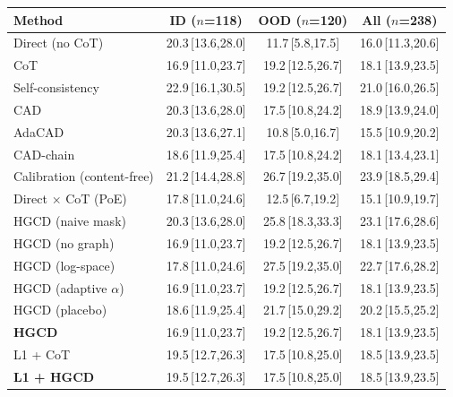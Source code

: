 \begin{tabular}{lccc}
\toprule
Method & ID ($n$=118) & OOD ($n$=120) & All ($n$=238) \\
\midrule
Direct (no CoT) & 20.3\,{\scriptsize[13.6,28.0]} & 11.7\,{\scriptsize[5.8,17.5]} & 16.0\,{\scriptsize[11.3,20.6]} \\
CoT & 16.9\,{\scriptsize[11.0,23.7]} & 19.2\,{\scriptsize[12.5,26.7]} & 18.1\,{\scriptsize[13.9,23.5]} \\
Self-consistency & 22.9\,{\scriptsize[16.1,30.5]} & 19.2\,{\scriptsize[12.5,26.7]} & 21.0\,{\scriptsize[16.0,26.5]} \\
CAD & 20.3\,{\scriptsize[13.6,28.0]} & 17.5\,{\scriptsize[10.8,24.2]} & 18.9\,{\scriptsize[13.9,24.0]} \\
AdaCAD & 20.3\,{\scriptsize[13.6,27.1]} & 10.8\,{\scriptsize[5.0,16.7]} & 15.5\,{\scriptsize[10.9,20.2]} \\
CAD-chain & 18.6\,{\scriptsize[11.9,25.4]} & 17.5\,{\scriptsize[10.8,24.2]} & 18.1\,{\scriptsize[13.4,23.1]} \\
Calibration (content-free) & 21.2\,{\scriptsize[14.4,28.8]} & 26.7\,{\scriptsize[19.2,35.0]} & 23.9\,{\scriptsize[18.5,29.4]} \\
Direct $\times$ CoT (PoE) & 17.8\,{\scriptsize[11.0,24.6]} & 12.5\,{\scriptsize[6.7,19.2]} & 15.1\,{\scriptsize[10.9,19.7]} \\
HGCD (naive mask) & 20.3\,{\scriptsize[13.6,28.0]} & 25.8\,{\scriptsize[18.3,33.3]} & 23.1\,{\scriptsize[17.6,28.6]} \\
HGCD (no graph) & 16.9\,{\scriptsize[11.0,23.7]} & 19.2\,{\scriptsize[12.5,26.7]} & 18.1\,{\scriptsize[13.9,23.5]} \\
HGCD (log-space) & 17.8\,{\scriptsize[11.0,24.6]} & 27.5\,{\scriptsize[19.2,35.0]} & 22.7\,{\scriptsize[17.6,28.2]} \\
HGCD (adaptive $\alpha$) & 16.9\,{\scriptsize[11.0,23.7]} & 19.2\,{\scriptsize[12.5,26.7]} & 18.1\,{\scriptsize[13.9,23.5]} \\
HGCD (placebo) & 18.6\,{\scriptsize[11.9,25.4]} & 21.7\,{\scriptsize[15.0,29.2]} & 20.2\,{\scriptsize[15.5,25.2]} \\
\textbf{HGCD} & 16.9\,{\scriptsize[11.0,23.7]} & 19.2\,{\scriptsize[12.5,26.7]} & 18.1\,{\scriptsize[13.9,23.5]} \\
L1 + CoT & 19.5\,{\scriptsize[12.7,26.3]} & 17.5\,{\scriptsize[10.8,25.0]} & 18.5\,{\scriptsize[13.9,23.5]} \\
\textbf{L1 + HGCD} & 19.5\,{\scriptsize[12.7,26.3]} & 17.5\,{\scriptsize[10.8,25.0]} & 18.5\,{\scriptsize[13.9,23.5]} \\
\bottomrule
\end{tabular}

